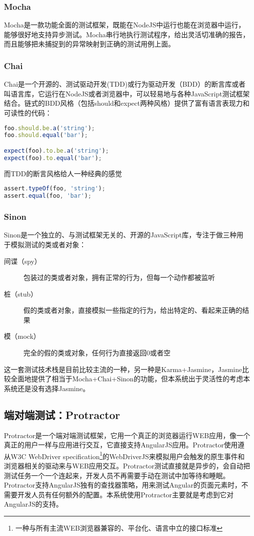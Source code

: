 \subsubsection{Mocha}
Mocha是一款功能全面的测试框架，既能在NodeJS中运行也能在浏览器中运行，能够很好地支持异步测试。Mocha串行地执行测试程序，给出灵活切准确的报告，而且能够把未捕捉到的异常映射到正确的测试用例上面。

\subsubsection{Chai}
Chai是一个开源的、测试驱动开发(TDD)或行为驱动开发（BDD）的断言库或者叫语言库，它运行在NodeJS或者浏览器中，可以轻易地与各种JavaScript测试框架结合。链式的BDD风格（包括should和expect两种风格）提供了富有语言表现力和可读性的代码：

\begin{lstlisting}[language={JavaScript}, caption={BDD风格的chai代码}]
foo.should.be.a('string');
foo.should.equal('bar');

expect(foo).to.be.a('string');
expect(foo).to.equal('bar');
\end{lstlisting}
而TDD的断言风格给人一种经典的感觉
\begin{lstlisting}[language={JavaScript}, caption={经典的断言风格}]
assert.typeOf(foo, 'string');
assert.equal(foo, 'bar');
\end{lstlisting}

\subsubsection{Sinon}
Sinon是一个独立的、与测试框架无关的、开源的JavaScript库，专注于做三种用于模拟测试的类或者对象：
\begin{description}
  \item[间谍（spy）] 包装过的类或者对象，拥有正常的行为，但每一个动作都被监听
  \item[桩（stub）] 假的类或者对象，直接模拟一些指定的行为，给出特定的、看起来正确的结果
  \item[模（mock）] 完全的假的类或对象，任何行为直接返回0或者空
\end{description}

这一套测试技术栈是目前比较主流的一种，另一种是Karma+Jasmine，Jasmine比较全面地提供了相当于Mocha+Chai+Sinon的功能，但本系统出于灵活性的考虑本系统还是没有选择Jasmine。
\subsection{端对端测试：Protractor}
Protractor是一个端对端测试框架，它用一个真正的浏览器运行WEB应用，像一个真正的用户一样与应用进行交互，它直接支持AngularJS应用。Protractor使用遵从W3C WebDriver specification\footnote{一种与所有主流WEB浏览器兼容的、平台化、语言中立的接口标准}的WebDriverJS来模拟用户会触发的原生事件和浏览器相关的驱动来与WEB应用交互。Protractor测试直接就是异步的，会自动把测试任务一个一个连起来，开发人员不再需要手动在测试中加等待和睡眠。Protractor支持AngularJS独有的查找器策略，用来测试Angular的页面元素时，不需要开发人员有任何额外的配置。本系统使用Protractor主要就是考虑到它对AngularJS的支持。
